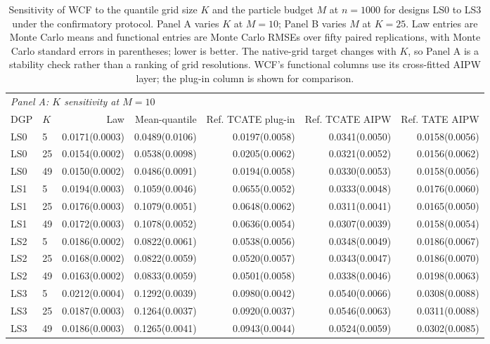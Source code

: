 \begin{table}[!ht]
\centering
\scriptsize
\setlength{\tabcolsep}{3pt}
\caption{Sensitivity of WCF to the quantile grid size $K$ and the particle budget $M$ at $n=1000$ for designs LS0 to LS3 under the confirmatory protocol. Panel A varies $K$ at $M=10$; Panel B varies $M$ at $K=25$. Law entries are Monte Carlo means and functional entries are Monte Carlo RMSEs over fifty paired replications, with Monte Carlo standard errors in parentheses; lower is better. The native-grid target changes with $K$, so Panel A is a stability check rather than a ranking of grid resolutions. WCF's functional columns use its cross-fitted AIPW layer; the plug-in column is shown for comparison.}
\label{tab:sensitivity-km}
\begin{tabular}{llrrrrr}
\toprule
\multicolumn{7}{l}{\textit{Panel A: $K$ sensitivity at $M=10$}} \\
DGP & $K$ & Law & Mean-quantile & Ref. TCATE plug-in & Ref. TCATE AIPW & Ref. TATE AIPW \\
\midrule
LS0 & 5 & 0.0171(0.0003) & 0.0489(0.0106) & 0.0197(0.0058) & 0.0341(0.0050) & 0.0158(0.0056) \\
LS0 & 25 & 0.0154(0.0002) & 0.0538(0.0098) & 0.0205(0.0062) & 0.0321(0.0052) & 0.0156(0.0062) \\
LS0 & 49 & 0.0150(0.0002) & 0.0486(0.0091) & 0.0194(0.0058) & 0.0330(0.0053) & 0.0158(0.0056) \\
LS1 & 5 & 0.0194(0.0003) & 0.1059(0.0046) & 0.0655(0.0052) & 0.0333(0.0048) & 0.0176(0.0060) \\
LS1 & 25 & 0.0176(0.0003) & 0.1079(0.0051) & 0.0648(0.0062) & 0.0311(0.0041) & 0.0165(0.0050) \\
LS1 & 49 & 0.0172(0.0003) & 0.1078(0.0052) & 0.0636(0.0054) & 0.0307(0.0039) & 0.0158(0.0054) \\
LS2 & 5 & 0.0186(0.0002) & 0.0822(0.0061) & 0.0538(0.0056) & 0.0348(0.0049) & 0.0186(0.0067) \\
LS2 & 25 & 0.0168(0.0002) & 0.0822(0.0059) & 0.0520(0.0057) & 0.0343(0.0047) & 0.0186(0.0070) \\
LS2 & 49 & 0.0163(0.0002) & 0.0833(0.0059) & 0.0501(0.0058) & 0.0338(0.0046) & 0.0198(0.0063) \\
LS3 & 5 & 0.0212(0.0004) & 0.1292(0.0039) & 0.0980(0.0042) & 0.0540(0.0066) & 0.0308(0.0088) \\
LS3 & 25 & 0.0187(0.0003) & 0.1264(0.0037) & 0.0920(0.0037) & 0.0546(0.0063) & 0.0311(0.0088) \\
LS3 & 49 & 0.0186(0.0003) & 0.1265(0.0041) & 0.0943(0.0044) & 0.0524(0.0059) & 0.0302(0.0085) \\

\end{tabular}
\end{table}
